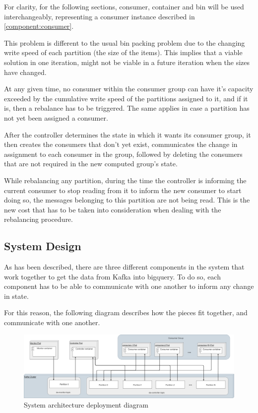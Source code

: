 For clarity, for the following sections, consumer, container and bin will be used interchangeably, representing a consumer instance described in \ref{component:consumer}.

This problem is different to the usual bin packing problem due to the changing write speed of each partition (the size of the items). This implies that a viable solution in one iteration, might not be viable in a future iteration when the sizes have changed.

At any given time, no consumer within the consumer group can have it's capacity exceeded by the cumulative write speed of the partitions assigned to it, and if it is, then a rebalance has to be triggered. The same applies in case a partition has not yet been assigned a consumer.

After the controller determines the state in which it wants its consumer group, it then creates the consumers that don't yet exist, communicates the change in assignment to each consumer in the group, followed by deleting the consumers that are not required in the new computed group's state.

While rebalancing any partition, during the time the controller is informing the current consumer to stop reading from it to inform the new consumer to start doing so, the messages belonging to this partition are not being read. This is the new cost that has to be taken into consideration when dealing with the rebalancing procedure.

\subsection{System Design}

As has been described, there are three different components in the system that work together to get the data from Kafka into bigquery. To do so, each component has to be able to communicate with one another to inform any change in state. 

For this reason, the following diagram describes how the pieces fit together, and communicate with one another.

\begin{figure}[H]
    \centering
    \includegraphics[width=\textwidth]{images/controller/System Design.png}
\caption{System architecture deployment diagram}
\label{fig:system_architecture}
\end{figure}

